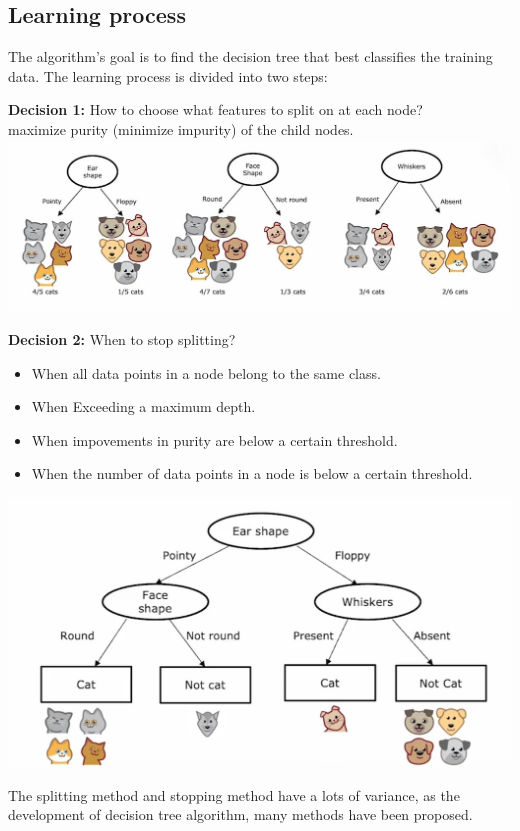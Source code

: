 \subsection*{Learning process}
The algorithm's goal is to find the decision tree that best classifies the training data.
The learning process is divided into two steps:\par
\textbf{Decision 1:} How to choose what features to split on at each node?\\
maximize purity (minimize impurity) of the child nodes.\\
\includegraphics[width=\textwidth]{images/11.3}
\par
\textbf{Decision 2:} When to stop splitting?\\
\begin{itemize}
    \item When all data points in a node belong to the same class.
    \item When Exceeding a maximum depth.
    \item When impovements in purity are below a certain threshold.
    \item When the number of data points in a node is below a certain threshold.
\end{itemize}
\par
\includegraphics*[width=\textwidth]{images/11.4}
\par
The splitting method and stopping method have a lots of variance,
as the development of decision tree algorithm, many methods have been proposed.
